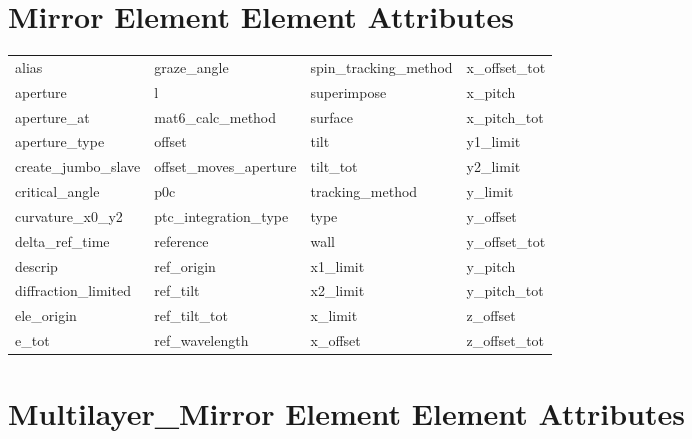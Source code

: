  \section{Mirror Element Element Attributes}
 \label{s:list.mirror}
 
 \begin{tabular}{llll} \toprule
alias                       & graze_angle                 & spin_tracking_method        & x_offset_tot                \\
aperture                    & l                           & superimpose                 & x_pitch                     \\
aperture_at                 & mat6_calc_method            & surface                     & x_pitch_tot                 \\
aperture_type               & offset                      & tilt                        & y1_limit                    \\
create_jumbo_slave          & offset_moves_aperture       & tilt_tot                    & y2_limit                    \\
critical_angle              & p0c                         & tracking_method             & y_limit                     \\
curvature_x0_y2             & ptc_integration_type        & type                        & y_offset                    \\
delta_ref_time              & reference                   & wall                        & y_offset_tot                \\
descrip                     & ref_origin                  & x1_limit                    & y_pitch                     \\
diffraction_limited         & ref_tilt                    & x2_limit                    & y_pitch_tot                 \\
ele_origin                  & ref_tilt_tot                & x_limit                     & z_offset                    \\
e_tot                       & ref_wavelength              & x_offset                    & z_offset_tot                \\
 \bottomrule
 \end{tabular}
 \vfill
 
 \section{Multilayer_Mirror Element Element Attributes}
 \label{s:list.multilayer.mirror}
 
